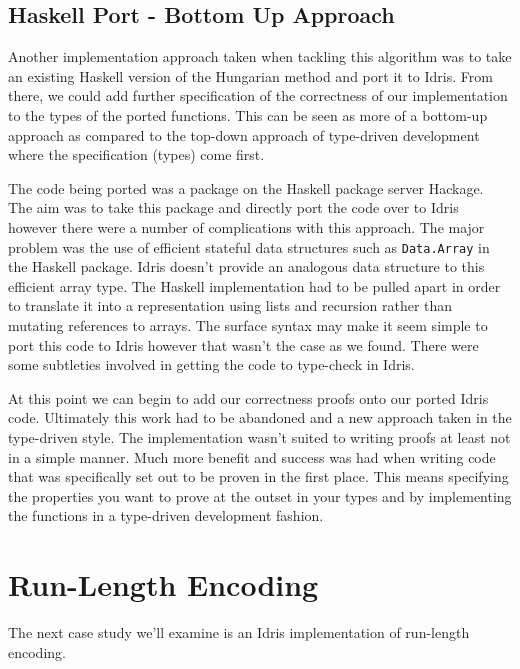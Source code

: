 \documentclass[a4paper, notitlepage]{report}
\begin{document}
\subsection{Haskell Port - Bottom Up Approach}
\label{sec:org0fce2a2}
Another implementation approach taken when tackling this algorithm was to take
an existing Haskell version of the Hungarian method and port it to Idris. From
there, we could add further specification of the correctness of our
implementation to the types of the ported functions. This can be seen as more of
a bottom-up approach as compared to the top-down approach of type-driven
development where the specification (types) come first.

The code being ported was a package \cite{komuves_munkres_2008} on the Haskell
package server Hackage. The aim was to take this package and directly port the
code over to Idris however there were a number of complications with this
approach. The major problem was the use of efficient stateful data structures
such as \texttt{Data.Array} in the Haskell package. Idris doesn't provide an analogous
data structure to this efficient array type. The Haskell implementation had to
be pulled apart in order to translate it into a representation using lists and
recursion rather than mutating references to arrays. The surface syntax may make
it seem simple to port this code to Idris however that wasn't the case as we
found. There were some subtleties involved in getting the code to type-check in
Idris.

At this point we can begin to add our correctness proofs onto our ported Idris
code. Ultimately this work had to be abandoned and a new approach taken in the
type-driven style. The implementation wasn't suited to writing proofs at least
not in a simple manner. Much more benefit and success was had when writing code
that was specifically set out to be proven in the first place. This means
specifying the properties you want to prove at the outset in your types and by
implementing the functions in a type-driven development fashion.

\section{Run-Length Encoding}
\label{sec:orgadd8631}
The next case study we'll examine is an Idris implementation of run-length
encoding.
\end{document}

